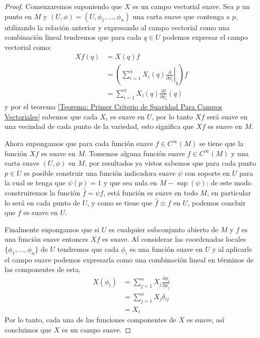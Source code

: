 \begin{proof}
	Comenzaremos suponiendo que $X$ es un campo vectorial suave. Sea $p$ un punto en $M$ y $(U,\phi) = (U,\phi_1,\ldots,\phi_n)$ una carta suave que contenga a $p$, utilizando la relación anterior y expresando al campo vectorial como una combinación lineal tendremos que para cada $q \in U$ podemos expresar el campo vectorial como:
	\begin{align*}
		Xf(q) & = X(q)f                                                       \\
		      & = \left(
		\sum_{i=1}^{n} X_i (q)
		\left.
		\frac{\partial}{\partial \phi_i}
		\right|_{q}
		\right) f                                                             \\
		      & = \sum_{i=1}^{n} X_i(q) \frac{\partial f}{\partial \phi_i}(q)
	\end{align*}
	y por el teorema \ref{Teorema: Primer Criterio de Suavidad Para Campos Vectoriales} sabemos que cada $X_i$ es suave en $U$, por lo tanto $Xf$ será suave en una vecindad de cada punto de la variedad, esto significa que $Xf$ es suave en $M$.

	Ahora supongamos que para cada función suave $f \in C^{\infty}(M)$ se tiene que la función $Xf$ es suave en $M$. Tomemos alguna función  suave $f \in C^{\infty}(M)$ y una carta suave $(U,\phi)$ en $M$, por resultados ya vistos sabemos que para cada punto $p \in U$ es posible construir una función indicadora suave $\psi$ con soporte en $U$ para la cual se tenga que $\psi(p) = 1$ y que sea nula en $M - \sup(\psi)$; de este modo construiremos la función $\hat{f} = \psi f$, está función es suave en todo $M$, en particular lo será en cada punto de $U$, y como se tiene que $\hat{f} \equiv f$ en $U$, podemos concluir que $f$ es suave en $U$.

	Finalmente supongamos que si $U$ es cualquier subconjunto abierto de $M$ y $f$ es una función suave entonces $Xf$ es suave. Al considerar las coordenadas locales $\{\phi_1, \ldots, \phi_n\}$ de $U$ tendremos que cada $\phi_i$ es una función suave en $U$ y al aplicarle el campo suave podemos expresarla como una combinación lineal en términos de las componentes de esta,
	\begin{align*}
		X(\phi_i) & = \sum_{j=1}^{n} X_j \frac{\partial \phi_i}{\partial \phi_j} \\
		          & = \sum_{j=1}^{n} X_j \delta_{ij}                             \\
		          & = X_i
	\end{align*}
	Por lo tanto, cada una de las funciones componentes de $X$ es suave, así concluimos que $X$ es un campo suave.
\end{proof}

